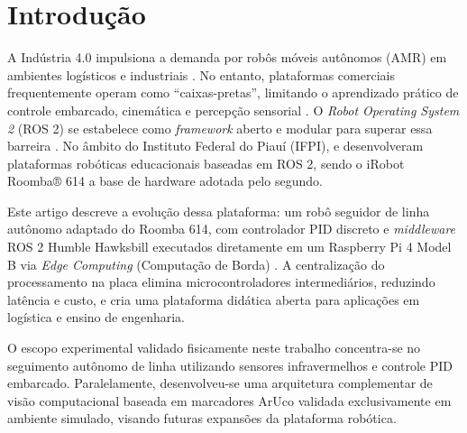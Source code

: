 \chapter{Introdução}

A Indústria 4.0 impulsiona a demanda por robôs móveis autônomos (AMR) em ambientes logísticos e industriais \cite{Anand_2024_intro, IFR2025, braun2022robot}. No entanto, plataformas comerciais frequentemente operam como ``caixas-pretas'', limitando o aprendizado prático de controle embarcado, cinemática e percepção sensorial \cite{patel2023open, jolles2022open}. O \textit{Robot Operating System 2} (ROS 2) se estabelece como \textit{framework} aberto e modular para superar essa barreira \cite{macenski2022robot}. No âmbito do Instituto Federal do Piauí (IFPI),  e  desenvolveram plataformas robóticas educacionais baseadas em ROS 2, sendo o iRobot Roomba® 614 a base de hardware adotada pelo segundo.

Este artigo descreve a evolução dessa plataforma: um robô seguidor de linha autônomo adaptado do Roomba 614, com controlador PID discreto e \textit{middleware} ROS 2 Humble Hawksbill executados diretamente em um Raspberry Pi 4 Model B via \textit{Edge Computing} (Computação de Borda) \cite{vega2025bridging, kortelainen2023short}. A centralização do processamento na placa elimina microcontroladores intermediários, reduzindo latência e custo, e cria uma plataforma didática aberta para aplicações em logística e ensino de engenharia.

O escopo experimental validado fisicamente neste trabalho concentra-se no seguimento autônomo de linha utilizando sensores infravermelhos e controle PID embarcado. Paralelamente, desenvolveu-se uma arquitetura complementar de visão computacional baseada em marcadores ArUco validada exclusivamente em ambiente simulado, visando futuras expansões da plataforma robótica.